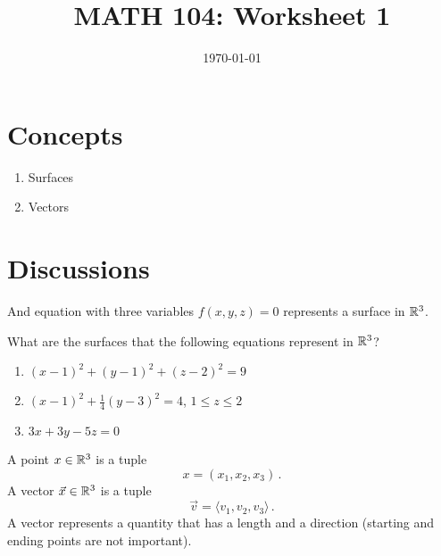 \documentclass[12pt]{amsart}
\title{ MATH 104: Worksheet 1}
\author{}
\date{\today}
\begin{document}
\maketitle

\section{Concepts}

\begin{enumerate}
	\item Surfaces
	\item Vectors
\end{enumerate}

\section{Discussions}

\begin{definition}[Surface in 3D]
	And equation with three variables $f(x,y,z) = 0$ represents a surface in $\mathbb{R}^3$.
\end{definition}

\begin{question}
	What are the surfaces that the following equations represent in $\mathbb{R}^3$?
	\begin{enumerate}
		\item $(x-1)^2 + (y-1)^2 + (z-2)^2 = 9$
		      \vspace{5cm}
		\item $(x-1)^2 + \frac{1}{4} (y -3)^2 = 4$, $1 \leq z \leq 2$
		      \vspace{5cm}
		\item $3x + 3y - 5z = 0$
		      \vspace{5cm}
	\end{enumerate}
\end{question}

\begin{definition}
	A point $x \in \mathbb{R}^3$ is a tuple
	\begin{equation*}
		x = ( x_1, x_2, x_3 ) \,.
	\end{equation*}
	A vector $\vec{x} \in \mathbb{R}^3$ is a tuple
	\begin{equation*}
		\vec{v} = \langle v_1, v_2, v_3 \rangle \,.
	\end{equation*}
	A vector represents a quantity that has a length and a direction (starting and ending points are not important).
\end{definition}
\end{document}
